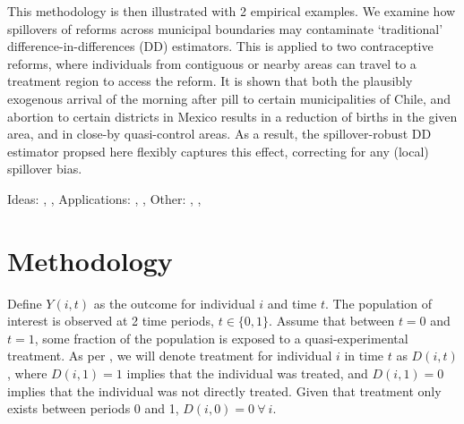 \documentclass{article}
\begin{document}
\begin{spacing}{1.1}
This methodology is then illustrated with 2 empirical examples.  We examine how
spillovers of reforms across municipal boundaries may contaminate `traditional' 
difference-in-differences (DD) estimators.  This is applied to two contraceptive
reforms, where individuals from contiguous or nearby areas can travel to a 
treatment region to access the reform.  It is shown that both the plausibly 
exogenous arrival of the morning after pill to certain municipalities of Chile, 
and abortion to certain districts in Mexico results in a reduction of births
in the given area, and in close-by quasi-control areas.  As a result, the
spillover-robust DD estimator propsed here flexibly captures this effect, 
correcting for any (local) spillover bias.



Ideas: \citet{McIntosh2008}, \citet{Bairdetal2014}, \citet{AngelucciDiMaro2010} 
Applications: \citet{AngelucciDeGiorgi2009}, \citet{Heckmanetal1998}, 
\citet{MiguelKremer2004}
Other: \citet{Imbens2004}, \citet{Heckmanetal1998b}, \citet{Manski2013}

\section{Methodology}
Define $Y(i,t)$ as the outcome for individual $i$ and time $t$.  The population
of interest is observed at 2 time periods, $t\in \{0,1\}$.  Assume that between
$t=0$ and $t=1$, some fraction of the population is exposed to a 
quasi-experimental treatment.  As per \citet{Abadie2005}, we will denote 
treatment for individual $i$ in time $t$ as $D(i,t)$, where $D(i,1)=1$ implies 
that the individual was treated, and $D(i,1)=0$ implies that the individual was
not directly treated.  Given that treatment only exists between periods 0 and 1,
$D(i,0)=0\ \forall\ i$.


\end{spacing}
\end{document}
